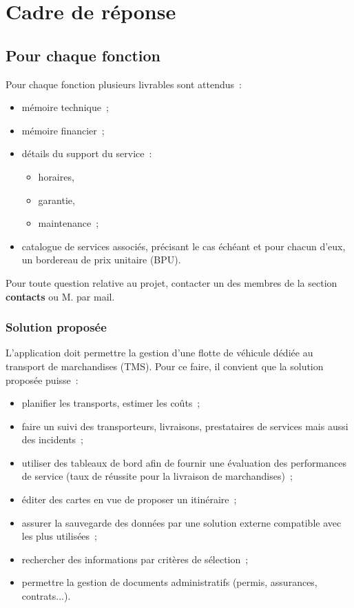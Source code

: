\chapter{Cadre de réponse}

\section{Pour chaque fonction}
Pour chaque fonction plusieurs livrables sont attendus~:
\begin{itemize}
	\item mémoire technique~;
	\item mémoire financier~;
	\item détails du support du service~:
	\begin{itemize}
		\item horaires,
		\item garantie,
		\item maintenance~;
	\end{itemize}
	\item catalogue de services associés, précisant le cas échéant et pour chacun d'eux, un bordereau de prix unitaire (BPU).
\end{itemize}
Pour toute question relative au projet, contacter un des membres de la section \textbf{contacts} ou M. \Agopian par mail.

\subsection{Solution proposée}
L'application doit permettre la gestion d'une flotte de véhicule dédiée au transport de marchandises (TMS). Pour ce faire, il convient que la solution proposée puisse~:
\begin{itemize}
	\item planifier les transports, estimer les coûts~;
	\item faire un suivi des transporteurs, livraisons, prestataires de services mais aussi des incidents~;
	\item utiliser des tableaux de bord afin de fournir une évaluation des performances de service (taux  de réussite pour la livraison de marchandises)~;
	\item éditer des cartes en vue de proposer un itinéraire~;
	\item assurer la sauvegarde des données par une solution externe compatible avec les plus utilisées~;
	\item rechercher des informations par critères de sélection~;
	\item permettre la gestion de documents administratifs (permis, assurances, contrats...).
\end{itemize}

